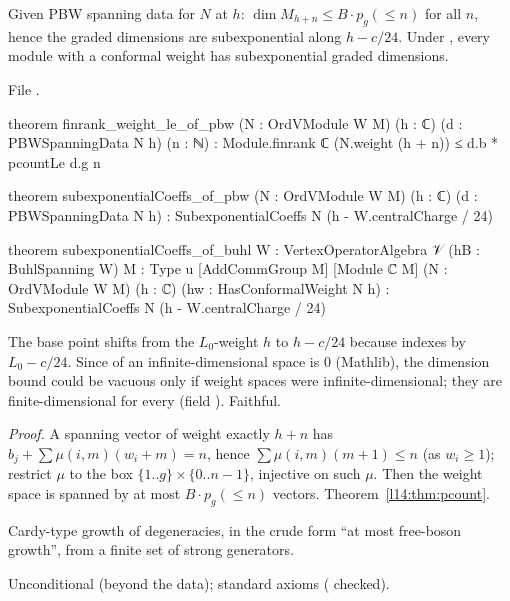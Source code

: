 \begin{theorem}\label{l14:thm:pbwgrowth}
Given PBW spanning data for $N$ at $h$: $\dim M_{h+n}\le B\cdot p_g(\le n)$ for all $n$, hence the graded dimensions are
subexponential along $h - c/24$. Under , every module with a conformal weight has subexponential graded
dimensions.
\end{theorem}
\noindent File .
\begin{leancode}
theorem finrank_weight_le_of_pbw (N : OrdVModule W M) (h : ℂ) (d : PBWSpanningData N h) (n : ℕ) :
    Module.finrank ℂ (N.weight (h + n)) ≤ d.b * pcountLe d.g n

theorem subexponentialCoeffs_of_pbw (N : OrdVModule W M) (h : ℂ) (d : PBWSpanningData N h) :
    SubexponentialCoeffs N (h - W.centralCharge / 24)

theorem subexponentialCoeffs_of_buhl {W : VertexOperatorAlgebra 𝒱} (hB : BuhlSpanning W)
    {M : Type u} [AddCommGroup M] [Module ℂ M] (N : OrdVModule W M) (h : ℂ)
    (hw : HasConformalWeight N h) : SubexponentialCoeffs N (h - W.centralCharge / 24)
\end{leancode}
\begin{dictionary}
The base point shifts from the $L_0$-weight $h$ to $h - c/24$ because  indexes by $L_0 - c/24$. Since
 of an infinite-dimensional space is $0$ (Mathlib), the dimension bound could be vacuous only if weight
spaces were infinite-dimensional; they are finite-dimensional for every  (field ). Faithful.
\end{dictionary}
\noindent\emph{Proof.} A spanning vector of weight exactly $h+n$ has $b_j + \sum\mu(i,m)(w_i+m) = n$, hence
$\sum\mu(i,m)(m+1)\le n$ (as $w_i\ge1$); restrict $\mu$ to the box $\{1..g\}\times\{0..n-1\}$, injective on such $\mu$. Then
the weight space is spanned by at most $B\cdot p_g(\le n)$ vectors. Theorem~\ref{l14:thm:pcount}.
\begin{physics}
Cardy-type growth of degeneracies, in the crude form ``at most free-boson growth'', from a finite set of strong generators.
\end{physics}
\begin{status}
Unconditional (beyond the data); standard axioms ( checked).
\end{status}

